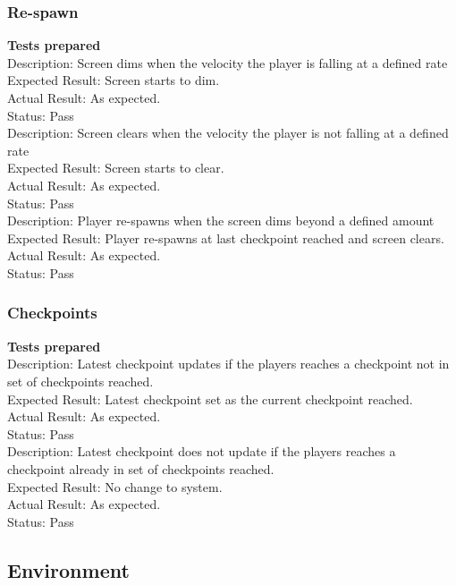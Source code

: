 \documentclass[11pt,a4paper]{article}
\begin{document}
\subsubsection{Re-spawn}
\textbf{Tests prepared}\\
Description: Screen dims when the velocity the player is falling at a defined rate\\
Expected Result: Screen starts to dim.\\
Actual Result: As expected.\\
Status: Pass
\smallskip\\
Description: Screen clears when the velocity the player is not falling at a defined rate\\
Expected Result: Screen starts to clear.\\
Actual Result: As expected.\\
Status: Pass
\smallskip\\
Description: Player re-spawns when the screen dims beyond a defined amount\\
Expected Result: Player re-spawns at last checkpoint reached and screen clears.\\
Actual Result: As expected.\\
Status: Pass
\subsubsection{Checkpoints}
\textbf{Tests prepared}\\
Description: Latest checkpoint updates if the players reaches a checkpoint not in set of checkpoints reached.\\
Expected Result: Latest checkpoint set as the current checkpoint reached.\\
Actual Result: As expected.\\
Status: Pass
\smallskip\\
Description: Latest checkpoint does not update if the players reaches a checkpoint already in set of checkpoints reached.\\
Expected Result: No change to system.\\
Actual Result: As expected.\\
Status: Pass

\subsection{Environment}
\end{document}
